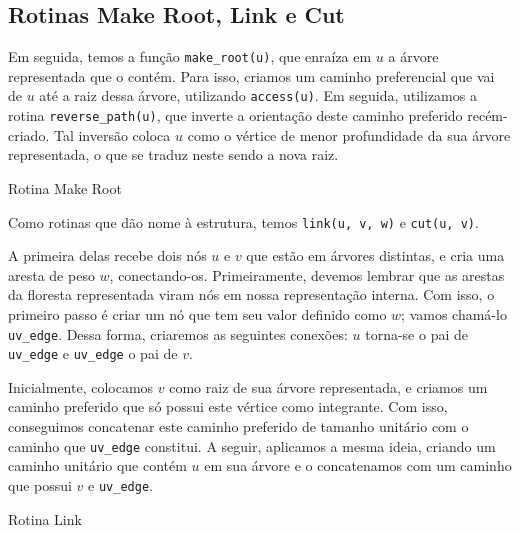 \subsection{Rotinas Make Root, Link e Cut}
\label{subsection:lct-make-root}

Em seguida, temos a função \texttt{make\_root(u)}, que enraíza em $u$ a árvore representada que o contém. Para isso, criamos um caminho preferencial que vai de $u$ até a raiz dessa árvore, utilizando \texttt{access(u)}. Em seguida, utilizamos a rotina \texttt{reverse\_path(u)}, que inverte a orientação deste caminho preferido recém-criado. Tal inversão coloca $u$ como o vértice de menor profundidade da sua árvore representada, o que se traduz neste sendo a nova raiz.

\begin{algorithm}[h!]
    \caption{Rotina Make Root}\label{lct:make-root}
    \begin{algorithmic}[1]
        \EndFunction
    \end{algorithmic}
\end{algorithm}

Como rotinas que dão nome à estrutura, temos \texttt{link(u, v, w)} e \texttt{cut(u, v)}.

A primeira delas recebe dois nós $u$ e $v$ que estão em árvores distintas, e cria uma aresta de peso $w$, conectando-os. Primeiramente, devemos lembrar que as arestas da floresta representada viram nós em nossa representação interna. Com isso, o primeiro passo é criar um nó que tem seu valor definido como $w$; vamos chamá-lo \texttt{uv\_edge}. Dessa forma, criaremos as seguintes conexões: $u$ torna-se o pai de \texttt{uv\_edge} e \texttt{uv\_edge} o pai de $v$.

Inicialmente, colocamos $v$ como raiz de sua árvore representada, e criamos um caminho preferido que só possui este vértice como integrante. Com isso, conseguimos concatenar este caminho preferido de tamanho unitário com o caminho que \texttt{uv\_edge} constitui. A seguir, aplicamos a mesma ideia, criando um caminho unitário que contém $u$ em sua árvore e o concatenamos com um caminho que possui $v$ e \texttt{uv\_edge}.

\begin{algorithm}[h!]
    \caption{Rotina Link}\label{lct:link}
    \begin{algorithmic}[1]
         
        \State {}
        \State {}
        \EndFunction
    \end{algorithmic}
\end{algorithm}

